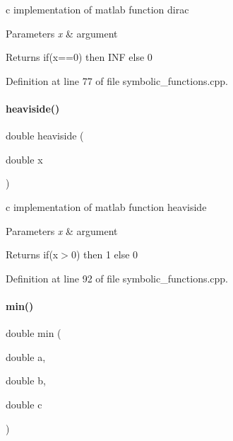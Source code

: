 c implementation of matlab function dirac


\begin{DoxyParams}{Parameters}
{\em x} & argument \\
\hline
\end{DoxyParams}
\begin{DoxyReturn}{Returns}
if(x==0) then I\+NF else 0 
\end{DoxyReturn}


Definition at line 77 of file symbolic\+\_\+functions.\+cpp.

\mbox{\label{namespaceamici_a609b523b00064e82442c1f1519f40bdb}} 
\paragraph{\texorpdfstring{heaviside()}{heaviside()}}
{\footnotesize\ttfamily double heaviside (\begin{DoxyParamCaption}\item[{double}]{x }\end{DoxyParamCaption})}

c implementation of matlab function heaviside


\begin{DoxyParams}{Parameters}
{\em x} & argument \\
\hline
\end{DoxyParams}
\begin{DoxyReturn}{Returns}
if(x$>$0) then 1 else 0 
\end{DoxyReturn}


Definition at line 92 of file symbolic\+\_\+functions.\+cpp.

\mbox{\label{namespaceamici_a0e1665a05c4dfee1572bea48f7930502}} 
\paragraph{\texorpdfstring{min()}{min()}}
{\footnotesize\ttfamily double min (\begin{DoxyParamCaption}\item[{double}]{a,  }\item[{double}]{b,  }\item[{double}]{c }\end{DoxyParamCaption})}

